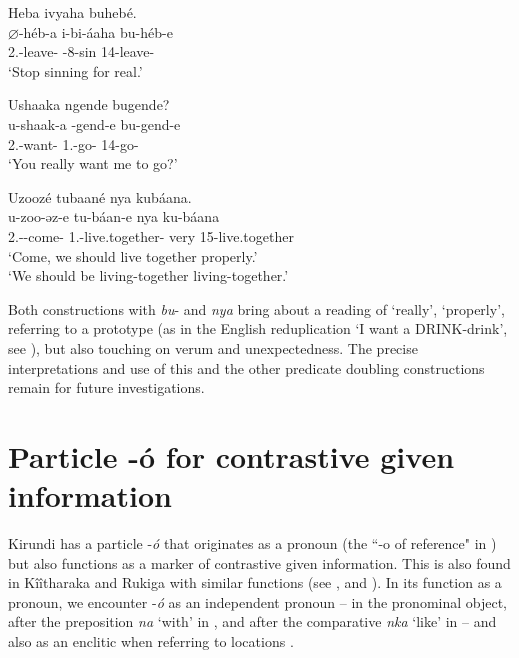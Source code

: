 \documentclass[output=paper]{langscibook}
\begin{document}
\ea
\label{bkm:Ref78492908}
Heba ivyaha buhebé.\\
\gll
$\varnothing$-héb-a  i-bi-áaha  bu-héb-e\\
2\SG.\SM{}-leave-\IMP{}  \AUG{}-8-sin  14-leave-\SBJV{}\\
\glt
‘Stop sinning for real.’\\

\z

\ea
\label{bkm:Ref78492919}
Ushaaka ngende bugende?\\
\gll
u-shaak-a  \N{}-gend-e  bu-gend-e\\
2\SG.\SM{}-want-\FV{}  1\SG.\SM-{}go-\SBJV{}  14-go-\SBJV{}\\
\glt
‘You really want me to go?’\\

\z

\ea
\label{bkm:Ref78492942}
Uzoozé tubaané nya kubáana.\\
\gll
u-zoo-əz-e  tu-báan-e  nya  ku-báana\\
2\SG.\SM{}-\FUT{}-come-\SBJV{}  1\PL.\SM-{}live.together-\SBJV{}  very  15-live.together\\
\glt
‘Come, we should live together properly.’\\
  ‘We should be living-together living-together.’


\z

Both constructions with \textit{bu}- and \textit{nya} bring about a reading of ‘really’, ‘properly’, referring to a prototype (as in the English reduplication ‘I want a DRINK-drink’, see \citealt{GhomeshiEtAl2004}), but also touching on verum and unexpectedness. The precise interpretations and use of this and the other predicate doubling constructions remain for future investigations.

\section{Particle -ó for contrastive given information}
\label{bkm:Ref72249299}
Kirundi has a particle -\textit{ó} that originates as a pronoun (the ``-o of reference" in \citealt{Ashton1945}) but also functions as a marker of contrastive given information. This is also found in Kîîtharaka and Rukiga with similar functions (see \citealt{AsiimwevanderWal2021}, \textcite{chapters/rukiga} and \textcite{chapters/kiitharaka}). In its function as a pronoun, we encounter -\textit{ó} as an independent pronoun – in  the pronominal object, after the preposition \textit{na} ‘with’ in , and after the comparative \textit{nka} ‘like’ in  – and also as an enclitic when referring to locations .
\end{document}
